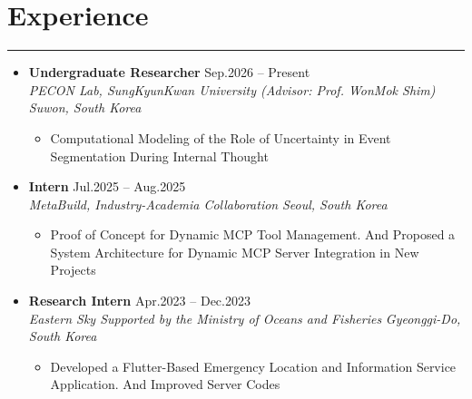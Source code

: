 \documentclass[letterpaper, 10pt]{article}
\begin{document}
\section*{Experience}
\hrule
\vspace{8pt}
\begin{itemize}
\item[]
    \textbf{Undergraduate Researcher} \hfill Sep.2026 -- Present \\
    \textit{PECON Lab, SungKyunKwan University (Advisor: Prof. WonMok Shim)} \hfill \textit{Suwon, South Korea}
    \begin{itemize}
        \item[] Computational Modeling of the Role of Uncertainty in Event Segmentation During Internal Thought
    \end{itemize}
\item[]
    \textbf{Intern} \hfill Jul.2025 -- Aug.2025 \\
    \textit{MetaBuild, Industry-Academia Collaboration} \hfill \textit{Seoul, South Korea}
    \begin{itemize}
        \item[] Proof of Concept for Dynamic MCP Tool Management. And Proposed a System Architecture for Dynamic MCP Server Integration in New Projects
    \end{itemize}
\item[]
    \textbf{Research Intern} \hfill Apr.2023 -- Dec.2023 \\
    \textit{Eastern Sky Supported by the Ministry of Oceans and Fisheries} \hfill \textit{Gyeonggi-Do, South Korea}
    \begin{itemize}
        \item[] Developed a Flutter-Based Emergency Location and Information Service Application. And Improved Server Codes
    \end{itemize}
\end{itemize}
\end{document}
